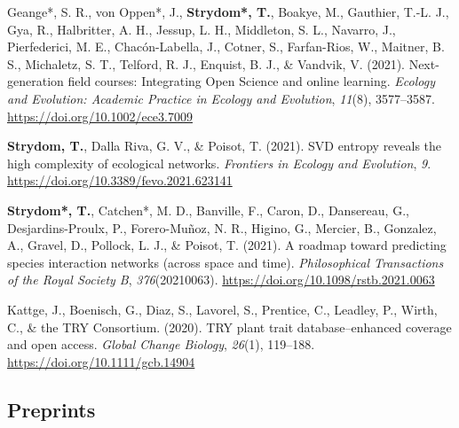 \documentclass[11pt,a4paper,]{awesome-cv}
\newlength{\cslhangindent}
\newenvironment{CSLReferences}[2] %
 {%
  \setlength{\parindent}{0pt}
  \ifodd #1 \everypar{\setlength{\hangindent}{\cslhangindent}}\ignorespaces\fi
  \ifnum #2 > 0
  \setlength{\parskip}{#2\baselineskip}
  \fi
 }%
 {}
\begin{document}
\begin{CSLReferences}{1}{0}
\leavevmode{}%
Geange*, S. R., von Oppen*, J., \textbf{Strydom*, T.}, Boakye, M.,
Gauthier, T.-L. J., Gya, R., Halbritter, A. H., Jessup, L. H.,
Middleton, S. L., Navarro, J., Pierfederici, M. E., Chacón-Labella, J.,
Cotner, S., Farfan-Rios, W., Maitner, B. S., Michaletz, S. T., Telford,
R. J., Enquist, B. J., \& Vandvik, V. (2021). Next-generation field
courses: {Integrating Open Science} and online learning. \emph{Ecology
and Evolution: Academic Practice in Ecology and Evolution},
\emph{11}(8), 3577--3587. \url{https://doi.org/10.1002/ece3.7009}

\leavevmode{}%
\textbf{Strydom, T.}, Dalla Riva, G. V., \& Poisot, T. (2021). SVD
entropy reveals the high complexity of ecological networks.
\emph{Frontiers in Ecology and Evolution}, \emph{9}.
\url{https://doi.org/10.3389/fevo.2021.623141}

\leavevmode{}%
\textbf{Strydom*, T.}, Catchen*, M. D., Banville, F., Caron, D.,
Dansereau, G., Desjardins-Proulx, P., Forero-Muñoz, N. R., Higino, G.,
Mercier, B., Gonzalez, A., Gravel, D., Pollock, L. J., \& Poisot, T.
(2021). A roadmap toward predicting species interaction networks (across
space and time). \emph{Philosophical Transactions of the Royal Society
B}, \emph{376}(20210063). \url{https://doi.org/10.1098/rstb.2021.0063}

\leavevmode{}%
Kattge, J., Boenisch, G., Diaz, S., Lavorel, S., Prentice, C., Leadley,
P., Wirth, C., \& the TRY Consortium. (2020). TRY plant trait
database--enhanced coverage and open access. \emph{Global Change
Biology}, \emph{26}(1), 119--188.
\url{https://doi.org/10.1111/gcb.14904}

\end{CSLReferences}

\vspace{\baselineskip}

\hypertarget{preprints}{%
\subsection{\texorpdfstring{\textbf{Preprints}}{Preprints}}\label{preprints}}
\end{document}

